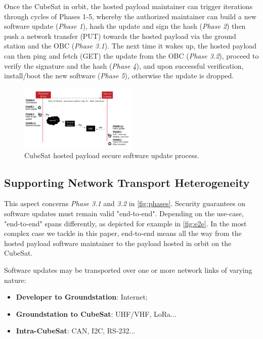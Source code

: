 Once the CubeSat in orbit, the hosted payload maintainer can trigger iterations through cycles of Phases 1-5, whereby
the authorized maintainer can build a new software update (\textit{Phase 1}), hash the update
and sign the hash (\textit{Phase 2}) then push a network transfer (PUT) towards the hosted payload via the ground station and the OBC (\textit{Phase 3.1}). The next time it wakes up, the hosted payload can
then ping and fetch (GET) the update from the OBC (\textit{Phase 3.2}), proceed to verify the signature and the hash (\textit{Phase 4}),
and upon successful verification, install/boot the new software (\textit{Phase 5}), otherwise the update is dropped.

\begin{figure}[t]
    \centering
    \includegraphics[width=0.5\textwidth]{Figures/CubeSat-Payload-update.png}
    \caption{CubeSat hosted payload secure software update process.}
    \label{fig:phases}
\end{figure}

\subsection{Supporting Network Transport Heterogeneity}
This aspect concerns \textit{Phase 3.1} and \textit{3.2} in \autoref{fig:phases}. Security guarantees on software updates must remain valid "end-to-end". Depending on the use-case, "end-to-end" spans differently, as depicted for example in \autoref{fig:e2e}. In the most complex case we tackle in this paper, end-to-end means all the way from the hosted payload software maintainer to the payload hosted in orbit on the CubeSat.

Software updates may be transported over one or more network links of varying nature: 
\begin{itemize}
\item {\bf Developer to Groundstation}: Internet;
\item {\bf Groundstation to CubeSat}: UHF/VHF, LoRa...
\item {\bf Intra-CubeSat}: CAN, I2C, RS-232...
\end{itemize}

